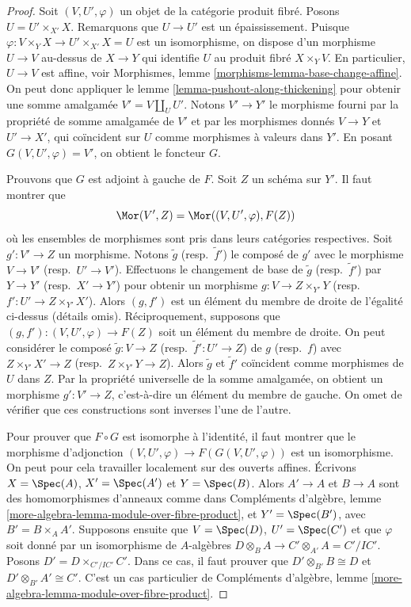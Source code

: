 \begin{proof}
Soit $(V, U', \varphi)$ un objet de la catégorie produit fibré.
Posons $U = U' \times_{X'} X$. Remarquons que $U \to U'$ est un épaississement.
Puisque $\varphi : V \times_Y X \to U' \times_{X'} X = U$ est un isomorphisme,
on dispose d'un morphisme $U \to V$ au-dessus de $X \to Y$ qui identifie $U$ au
produit fibré $X \times_Y V$. En particulier, $U \to V$ est affine, voir
Morphismes, lemme \ref{morphisms-lemma-base-change-affine}.
On peut donc appliquer le lemme \ref{lemma-pushout-along-thickening}
pour obtenir une somme amalgamée $V' = V \amalg_U U'$. Notons $V' \to Y'$ le morphisme
fourni par la propriété de somme amalgamée de $V'$ et par
les morphismes donnés $V \to Y$ et $U' \to X'$, qui coïncident sur $U$
comme morphismes à valeurs dans $Y'$. En posant $G(V, U', \varphi) = V'$,
on obtient le foncteur $G$.

\medskip\noindent
Prouvons que $G$ est adjoint à gauche de $F$. Soit $Z$ un schéma
sur $Y'$. Il faut montrer que
$$
\Mor(V', Z) = \Mor((V, U', \varphi), F(Z))
$$
où les ensembles de morphismes sont pris dans leurs catégories respectives.
Soit $g' : V' \to Z$ un morphisme. Notons $\tilde g$ (resp.\ $\tilde f'$)
le composé de $g'$ avec le morphisme $V \to V'$ (resp.\ $U' \to V'$).
Effectuons le changement de base de $\tilde g$ (resp.\ $\tilde f'$) par $Y \to Y'$ (resp.\ $X' \to Y'$)
pour obtenir un morphisme $g : V \to Z \times_{Y'} Y$
(resp.\ $f' : U' \to Z \times_{Y'} X'$). Alors $(g, f')$ est un élément
du membre de droite de l'égalité ci-dessus (détails omis).
Réciproquement, supposons que $(g, f') : (V, U', \varphi) \to F(Z)$ soit un
élément du membre de droite.
On peut considérer le composé $\tilde g : V \to Z$
(resp.\ $\tilde f' : U' \to Z$) de $g$ (resp.\ $f$) avec
$Z \times_{Y'} X' \to Z$ (resp.\ $Z \times_{Y'} Y \to Z$).
Alors $\tilde g$ et $\tilde f'$ coïncident comme morphismes de $U$ dans $Z$.
Par la propriété universelle de la somme amalgamée, on obtient un morphisme
$g' : V' \to Z$, c'est-à-dire un élément du membre de gauche.
On omet de vérifier que ces constructions sont inverses l'une de l'autre.

\medskip\noindent
Pour prouver que $F \circ G$ est isomorphe à l'identité, il faut
montrer que le morphisme d'adjonction
$(V, U', \varphi) \to F(G(V, U', \varphi))$ est un isomorphisme.
On peut pour cela travailler localement sur des ouverts affines. Écrivons $X = \Spec(A)$, $X' = \Spec(A')$
et $Y = \Spec(B)$. Alors $A' \to A$ et $B \to A$ sont des homomorphismes d'anneaux comme dans
Compléments d'algèbre, lemme \ref{more-algebra-lemma-module-over-fibre-product},
et $Y' = \Spec(B')$, avec $B' = B \times_A A'$. Supposons ensuite que
$V = \Spec(D)$, $U' = \Spec(C')$ et que $\varphi$ soit donné par un
isomorphisme de $A$-algèbres $D \otimes_B A \to C' \otimes_{A'} A = C'/IC'$.
Posons $D' = D \times_{C'/IC'} C'$. Dans ce cas, il faut
prouver que $D' \otimes_{B'} B \cong D$ et $D' \otimes_{B'} A' \cong C'$.
C'est un cas particulier de Compléments d'algèbre, lemme
\ref{more-algebra-lemma-module-over-fibre-product}.
\end{proof}

